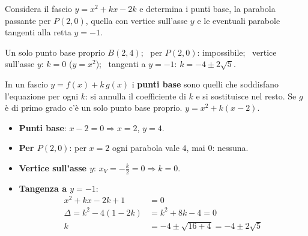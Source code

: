 \begin{question}[ID=5.2, subtitle={Fascio $y=x^2+kx-2k$: punti base e proprietà}, difficulty=media, tags={parabola, fasci}]
Considera il fascio $y=x^2+kx-2k$ e determina i punti base, la parabola passante per $P(2,0)$, quella con vertice sull'asse $y$ e le eventuali parabole tangenti alla retta $y=-1$.
\begin{solution}
Un solo punto base proprio $B(2,4)$; \ per $P(2,0)$: impossibile; \ vertice sull'asse $y$: $k=0$ ($y=x^2$); \ tangenti a $y=-1$: $k=-4\pm2\sqrt5$.
\end{solution}
\begin{explanation}
In un fascio $y=f(x)+k\,g(x)$ i \textbf{punti base} sono quelli che soddisfano l'equazione per ogni $k$: si annulla il coefficiente di $k$ e si sostituisce nel resto. Se $g$ è di primo grado c'è un solo punto base proprio.
$y=x^2+k(x-2)$.
\begin{itemize}
    \item \textbf{Punti base}: $x-2=0 \Rightarrow x=2$, $y=4$.
    \item \textbf{Per $P(2,0)$}: per $x=2$ ogni parabola vale $4$, mai $0$: nessuna.
    \item \textbf{Vertice sull'asse $y$}: $x_V=-\tfrac k2=0 \Rightarrow k=0$.
    \item \textbf{Tangenza a $y=-1$}:
    \[\begin{aligned}
    x^2+kx-2k+1 &= 0\\
    \Delta=k^2-4(1-2k) &= k^2+8k-4=0\\
    k &= -4\pm\sqrt{16+4}=-4\pm2\sqrt5
    \end{aligned}\]
\end{itemize}
\end{explanation}
\end{question}


